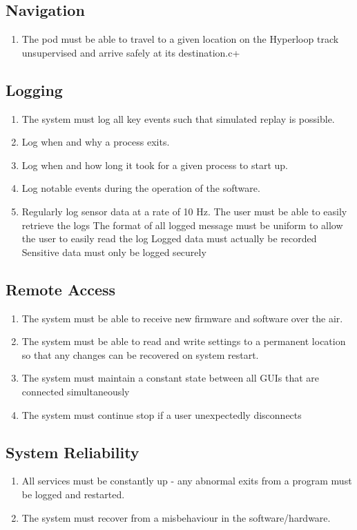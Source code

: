\subsection{Navigation}
\begin{enumerate}
    \item The pod must be able to travel to a given location on the Hyperloop track unsupervised and arrive safely at its destination.c+
\end{enumerate}

\subsection{Logging}
\begin{enumerate}
    \item The system must log all key events such that simulated replay is possible.
    \item Log when and why a process exits.
    \item Log when and how long it took for a given process to start up.
    \item Log notable events during the operation of the software.
    \item Regularly log sensor data at a rate of 10 Hz.
The user must be able to easily retrieve the logs
The format of all logged message must be uniform to allow the user to easily read the log
Logged data must actually be recorded
Sensitive data must only be logged securely
\end{enumerate}

\subsection{Remote Access}
\begin{enumerate}
    \item The system must be able to receive new firmware and software over the air.
    \item The system must be able to read and write settings to a permanent location so that any changes can be recovered on system restart.
    \item The system must maintain a constant state between all GUIs that are connected simultaneously
    \item The system must continue stop if a user unexpectedly disconnects
\end{enumerate}

\subsection{System Reliability}
\begin{enumerate}
    \item All services must be constantly up - any abnormal exits from a program must be logged and restarted.
    \item The system must recover from a misbehaviour in the software/hardware.
\end{enumerate}
